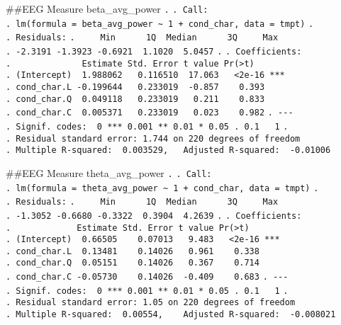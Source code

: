 \documentclass[
]{article}
\begin{document}
\#\#EEG Measure beta\_avg\_power \texttt{.} \texttt{.\ Call:}
\texttt{.\ lm(formula\ =\ beta\_avg\_power\ \textasciitilde{}\ 1\ +\ cond\_char,\ data\ =\ tmpt)}
\texttt{.} \texttt{.\ Residuals:}
\texttt{.\ \ \ \ \ Min\ \ \ \ \ \ 1Q\ \ Median\ \ \ \ \ \ 3Q\ \ \ \ \ Max}
\texttt{.\ -2.3191\ -1.3923\ -0.6921\ \ 1.1020\ \ 5.0457} \texttt{.}
\texttt{.\ Coefficients:}
\texttt{.\ \ \ \ \ \ \ \ \ \ \ \ \ \ Estimate\ Std.\ Error\ t\ value\ Pr(\textgreater{}\textbar{}t\textbar{})}
\texttt{.\ (Intercept)\ \ 1.988062\ \ \ 0.116510\ \ 17.063\ \ \ \textless{}2e-16\ ***}
\texttt{.\ cond\_char.L\ -0.199644\ \ \ 0.233019\ \ -0.857\ \ \ \ 0.393}
\texttt{.\ cond\_char.Q\ \ 0.049118\ \ \ 0.233019\ \ \ 0.211\ \ \ \ 0.833}
\texttt{.\ cond\_char.C\ \ 0.005371\ \ \ 0.233019\ \ \ 0.023\ \ \ \ 0.982}
\texttt{.\ -\/-\/-}
\texttt{.\ Signif.\ codes:\ \ 0\ \textquotesingle{}***\textquotesingle{}\ 0.001\ \textquotesingle{}**\textquotesingle{}\ 0.01\ \textquotesingle{}*\textquotesingle{}\ 0.05\ \textquotesingle{}.\textquotesingle{}\ 0.1\ \textquotesingle{}\ \textquotesingle{}\ 1}
\texttt{.}
\texttt{.\ Residual\ standard\ error:\ 1.744\ on\ 220\ degrees\ of\ freedom}
\texttt{.\ Multiple\ R-squared:\ \ 0.003529,\ \ \ Adjusted\ R-squared:\ \ -0.01006}

\#\#EEG Measure theta\_avg\_power \texttt{.} \texttt{.\ Call:}
\texttt{.\ lm(formula\ =\ theta\_avg\_power\ \textasciitilde{}\ 1\ +\ cond\_char,\ data\ =\ tmpt)}
\texttt{.} \texttt{.\ Residuals:}
\texttt{.\ \ \ \ \ Min\ \ \ \ \ \ 1Q\ \ Median\ \ \ \ \ \ 3Q\ \ \ \ \ Max}
\texttt{.\ -1.3052\ -0.6680\ -0.3322\ \ 0.3904\ \ 4.2639} \texttt{.}
\texttt{.\ Coefficients:}
\texttt{.\ \ \ \ \ \ \ \ \ \ \ \ \ Estimate\ Std.\ Error\ t\ value\ Pr(\textgreater{}\textbar{}t\textbar{})}
\texttt{.\ (Intercept)\ \ 0.66505\ \ \ \ 0.07013\ \ \ 9.483\ \ \ \textless{}2e-16\ ***}
\texttt{.\ cond\_char.L\ \ 0.13481\ \ \ \ 0.14026\ \ \ 0.961\ \ \ \ 0.338}
\texttt{.\ cond\_char.Q\ \ 0.05151\ \ \ \ 0.14026\ \ \ 0.367\ \ \ \ 0.714}
\texttt{.\ cond\_char.C\ -0.05730\ \ \ \ 0.14026\ \ -0.409\ \ \ \ 0.683}
\texttt{.\ -\/-\/-}
\texttt{.\ Signif.\ codes:\ \ 0\ \textquotesingle{}***\textquotesingle{}\ 0.001\ \textquotesingle{}**\textquotesingle{}\ 0.01\ \textquotesingle{}*\textquotesingle{}\ 0.05\ \textquotesingle{}.\textquotesingle{}\ 0.1\ \textquotesingle{}\ \textquotesingle{}\ 1}
\texttt{.}
\texttt{.\ Residual\ standard\ error:\ 1.05\ on\ 220\ degrees\ of\ freedom}
\texttt{.\ Multiple\ R-squared:\ \ 0.00554,\ \ \ \ Adjusted\ R-squared:\ \ -0.008021}
\end{document}
